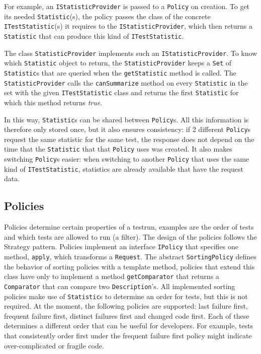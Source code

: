 \documentclass[i2]{oss}
\newcommand{\class}[1]{\texttt{#1}}
\newcommand{\method}[1]{\texttt{#1}}
\begin{document}
For example, an \class{IStatisticProvider} is passed to a \class{Policy} on creation.
To get its needed \class{Statistic}(s), the policy passes the class of the 
concrete \class{ITestStatistic}(s) it requires to the \class{IStatisticProvider},
which then returns a \class{Statistic} that can produce this kind of
\class{ITestStatistic}.

The class \class{StatisticProvider} implements such an \class{IStatisticProvider}. To know which \class{Statistic} object to return, the \class{StatisticProvider} keeps a \class{Set} of \class{Statistic}s 
that are queried when the \method{getStatistic} method is called.
The \class{StatisticProvider} calls the \method{canSummarize} method on every \class{Statistic} in the set with the given 
\class{ITestStatistic} class and returns the first \class{Statistic}
for which this method returns \emph{true}.

In this way, \class{Statistic}s can be shared between \class{Policy}s. All this information is therefore only stored once, but it also ensures consistency: if 2 different \class{Policy}s request the
same statistic for the same test, the response does not depend on the time that
the \class{Statistic} that that \class{Policy} uses was created.
It also makes switching \class{Policy}s easier: when switching to another \class{Policy} that uses the same kind of 
\class{ITestStatistic}, statistics are already available that have the request data.



\subsection{Policies}
\label{subssec: Policies}

Policies determine certain properties of a testrun, examples are
the order of tests and which tests are allowed to run (a filter).
The design of the policies follows the Strategy pattern.
Policies implement an interface \class{IPolicy} that specifies one method,
\method{apply}, which transforms a \class{Request}.
The abstract \class{SortingPolicy} defines the behavior of sorting
policies with a template method, policies that extend this class have
only to implement a method \method{getComparator} that returns a 
\class{Comparator} that can compare two \class{Description}'s.
All implemented sorting policies make use of \class{Statistic}s to 
determine an order for tests, but this is not required.
At the moment, the following policies are supported: last failure first, 
frequent failure first, distinct failures first and changed code  first.
Each of these determines a different order that can be useful for
developers.
For example, tests that consistently order first under the frequent
failure first policy might indicate over-complicated or fragile code.
\end{document}
